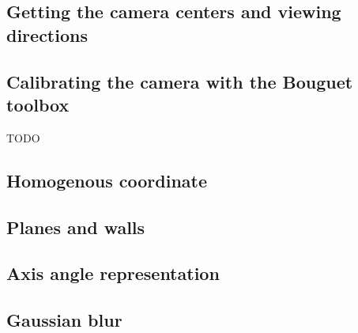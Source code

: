 \subsection{Getting the camera centers and viewing directions}
\label{sec:cameracenters}

\subsection{Calibrating the camera with the Bouguet toolbox}
\label{sec:bouguet}
TODO



\subsection{Homogenous coordinate}


\subsection{Planes and walls}
\label{sec:planeswalls}

\subsection{Axis angle representation}
\label{sec:axisAngle}

\subsection{Gaussian blur}
